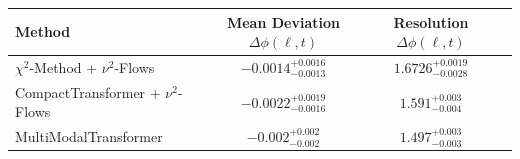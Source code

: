     \begin{tabular}{lccc}
        \toprule
        Method & Mean Deviation $\Delta\phi(\ell, t)$ & Resolution $\Delta\phi(\ell, t)$ \\
        \midrule
        $\chi^2$-Method + $\nu^2$-Flows & $-0.0014^{+0.0016}_{-0.0013}$ & $1.6726^{+0.0019}_{-0.0028}$ \\
        CompactTransformer + $\nu^2$-Flows & $-0.0022^{+0.0019}_{-0.0016}$ & $1.591^{+0.003}_{-0.004}$ \\
        MultiModalTransformer & $-0.002^{+0.002}_{-0.002}$ & $1.497^{+0.003}_{-0.003}$ \\
        \bottomrule
    \end{tabular}